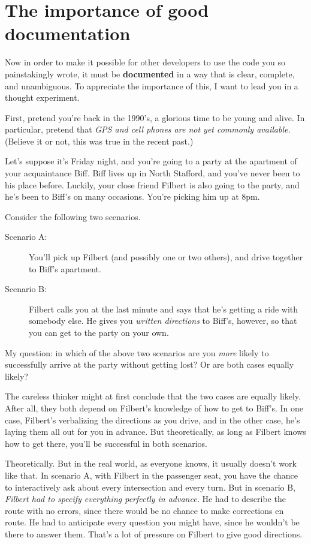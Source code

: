 \section{The importance of good documentation}

Now in order to make it possible for other developers to use the code you so
painstakingly wrote, it must be \textbf{documented} in a way that is clear,
complete, and unambiguous. To appreciate the importance of this, I want to
lead you in a thought experiment.

First, pretend you're back in the 1990's, a glorious time to be young and
alive. In particular, pretend that \textit{GPS and cell phones are not yet
commonly available.} (Believe it or not, this was true in the recent past.)

Let's suppose it's Friday night, and you're going to a party at the apartment
of your acquaintance Biff. Biff lives up in North Stafford, and you've never
been to his place before. Luckily, your close friend Filbert is also going to
the party, and he's been to Biff's on many occasions. You're picking him up at
8pm.

Consider the following two scenarios.

\begin{description}

\item[Scenario A:] You'll pick up Filbert (and possibly one or two others), and
drive together to Biff's apartment.

\item[Scenario B:] Filbert calls you at the last minute and says that he's
getting a ride with somebody else. He gives you \textit{written directions} to
Biff's, however, so that you can get to the party on your own.

\end{description}

My question: in which of the above two scenarios are you \textit{more} likely
to successfully arrive at the party without getting lost? Or are both cases
equally likely?

The careless thinker might at first conclude that the two cases are equally
likely. After all, they both depend on Filbert's knowledge of how to get to
Biff's. In one case, Filbert's verbalizing the directions as you drive, and in
the other case, he's laying them all out for you in advance. But
theoretically, as long as Filbert knows how to get there, you'll be successful
in both scenarios.

Theoretically. But in the real world, as everyone knows, it usually doesn't
work like that. In scenario A, with Filbert in the passenger seat, you have the
chance to interactively ask about every intersection and every turn. But in
scenario B, \textit{Filbert had to specify everything perfectly in advance.}
He had to describe the route with no errors, since there would be no chance to
make corrections en route. He had to anticipate every question you might have,
since he wouldn't be there to answer them. That's a lot of pressure on Filbert
to give good directions.

